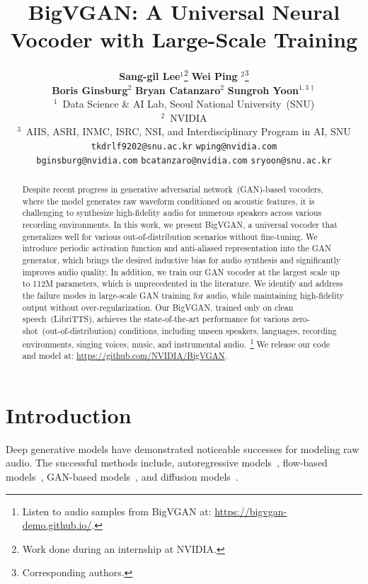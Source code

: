 \documentclass{article} \usepackage{iclr2023_conference,times}
\title{BigVGAN: A Universal Neural Vocoder with Large-Scale Training}
\author{
\textbf{\hspace{-.1cm}Sang-gil Lee}$^{1}$\thanks{Work done during an internship at NVIDIA.}
\hspace{2.0em}
\textbf{Wei Ping} $^{2}$\thanks{Corresponding authors.}
\vspace{.1cm}
\hspace{1em} \\
\textbf{\hspace{-.25mm}Boris Ginsburg}$^{2}$
\hspace{.8em}
\textbf{Bryan Catanzaro}$^{2}$
\hspace{.8em}
\textbf{Sungroh Yoon}$^{1,3\dagger}$ \vspace{2mm}\\
$^{1}$~Data Science \& AI Lab, Seoul National University~(SNU) \vspace{.5mm} \\
$^{2}$~NVIDIA \vspace{.5mm}\\
$^{3}$~AIIS, ASRI, INMC, ISRC, NSI, and Interdisciplinary Program in AI, SNU \vspace{2mm} \\
\texttt{tkdrlf9202@snu.ac.kr} \hspace{0.5em} \texttt{wping@nvidia.com} 
\\
\texttt{bginsburg@nvidia.com}  \hspace{0.5em}
 \texttt{bcatanzaro@nvidia.com} \hspace{0.5em} \texttt{sryoon@snu.ac.kr} \\
}
\theoremstyle{plain}
\theoremstyle{definition}
\theoremstyle{remark}
\begin{document}
\maketitle

\begin{abstract}
Despite recent progress in generative adversarial network~(GAN)-based vocoders, where the model generates raw waveform conditioned on acoustic features, it is challenging to synthesize high-fidelity audio for numerous speakers across various recording environments.  
In this work, we present BigVGAN, a universal vocoder that generalizes well for various out-of-distribution scenarios without fine-tuning.
We introduce periodic activation function and anti-aliased representation into the GAN generator, which brings the desired inductive bias for audio synthesis and significantly improves audio quality.
In addition, we train our GAN vocoder at the largest scale up to 112M parameters, which is unprecedented in the literature. We identify and address the failure modes in large-scale GAN training for audio, while maintaining high-fidelity output without over-regularization. 
Our BigVGAN, trained only on clean speech~(LibriTTS), achieves the state-of-the-art performance for various zero-shot~(out-of-distribution) conditions, including unseen speakers, languages, recording environments, singing voices, music,  and instrumental audio.~\footnote{Listen to audio samples from BigVGAN at: {\url{https://bigvgan-demo.github.io/}}. }
We release our code and model at:  {\small \url{https://github.com/NVIDIA/BigVGAN}}.
\end{abstract}


\vspace{-.2cm}
\section{Introduction}
\label{sec:intro}
\vspace{-.1cm}
Deep generative models have demonstrated noticeable successes for modeling raw audio.
The successful methods include, autoregressive models~\citep{oord2016wavenet, mehri2016samplernn, kalchbrenner2018efficient}, flow-based models~\citep{oord2017parallel,ping2018clarinet, prenger2019waveglow, kim2018flowavenet, ping2019waveflow, lee2020nanoflow}, GAN-based models~\citep{donahue2018adversarial, kumar2019melgan,binkowski2020high, yamamoto2020parallel, kong2020hifi}, and diffusion models~\citep{kong2020diffwave, chen2020wavegrad, lee2022priorgrad}.
\end{document}
